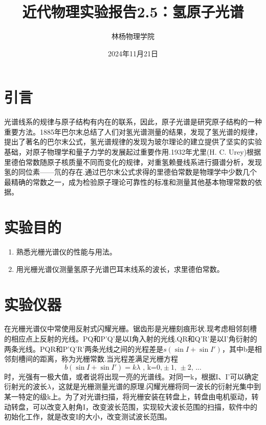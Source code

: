 \documentclass[a4paper]{article}
\title{近代物理实验报告2.5：氢原子光谱}
\author{林杨\quad 211840092\quad 物理学院}
\date{2024年11月21日}
\begin{document}
\maketitle


\section{引言}
光谱线系的规律与原子结构有内在的联系，因此，原子光谱是研究原子结构的一种重要方法。1885年巴尔末总结了人们对氢光谱测量的结果，发现了氢光谱的规律，提出了著名的巴尔末公式，氢光谱规律的发现为玻尔理论的建立提供了坚实的实验基础，对原子物理学和量子力学的发展起过重要作用.1932年尤里(H. C. Urey)根据里德伯常数随原子核质量不同而变化的规律，对重氢赖曼线系进行摄谱分析，发现氢的同位素——氘的存在.通过巴尔末公式求得的里德伯常数是物理学中少数几个最精确的常数之一，成为检验原子理论可靠性的标准和测量其他基本物理常数的依据。


\section{实验目的}
\begin{enumerate}
\item 熟悉光栅光谱仪的性能与用法。
\item 用光栅光谱仪测量氢原子光谱巴耳末线系的波长，求里德伯常数。
\end{enumerate}

\section{实验仪器}
在光栅光谱仪中常使用反射式闪耀光栅。锯齿形是光栅刻痕形状.现考虑相邻刻槽的相应点上反射的光线。PQ和P'Q'是以I角入射的光线.QR和Q'R'是以I'角衍射的两条光线。PQR和P'Q'R'两条光线之间的光程差是$s(\sin I+\sin I')$，其中b是相邻刻槽间的距离，称为光栅常数.当光程差满足光栅方程
\begin{equation}
b(\sin I+\sin I') = k\lambda\text{ , k=0,}\pm\text{1, }\pm\text{2, ...}
\end{equation}
时，光强有一极大值，或者说将出现一亮的光谱线。对同一k，根据I、I'可以确定衍射光的波长$\lambda$，这就是光栅测量光谱的原理.闪耀光栅将同一波长的衍射光集中到某一特定的级k上。为了对光谱扫描，将光栅安装在转盘上，转盘由电机驱动，转动转盘，可以改变入射角I，改变波长范围，实现较大波长范围的扫描，软件中的初始化工作，就是改变I的大小，改变测试波长范围。
\end{document}
